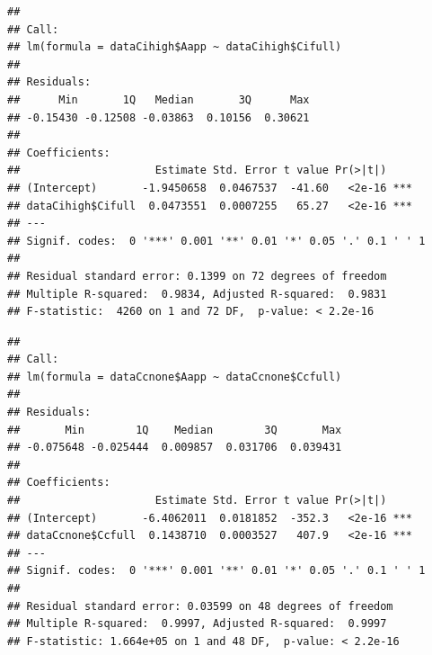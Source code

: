 \documentclass[
]{krantz}
\makeatletter
\newenvironment{Shaded}{\begin{snugshade}}{\end{snugshade}}
\newcommand{\CommentTok}[1]{\textcolor[rgb]{0.56,0.35,0.01}{\textit{#1}}}
\newcommand{\DecValTok}[1]{\textcolor[rgb]{0.00,0.00,0.81}{#1}}
\newcommand{\KeywordTok}[1]{\textcolor[rgb]{0.13,0.29,0.53}{\textbf{#1}}}
\newcommand{\NormalTok}[1]{#1}
\newcommand{\OperatorTok}[1]{\textcolor[rgb]{0.81,0.36,0.00}{\textbf{#1}}}
\newcommand{\StringTok}[1]{\textcolor[rgb]{0.31,0.60,0.02}{#1}}
\newenvironment{kframe}{%
\medskip{}
\setlength{\fboxsep}{.8em}
 \def\at@end@of@kframe{}%
 \ifinner\ifhmode%
  \def\at@end@of@kframe{\end{minipage}}%
  \begin{minipage}{\columnwidth}%
 \fi\fi%
 \def\FrameCommand##1{\hskip\@totalleftmargin \hskip-\fboxsep
 \colorbox{shadecolor}{##1}\hskip-\fboxsep
     \hskip-\linewidth \hskip-\@totalleftmargin \hskip\columnwidth}%
 \MakeFramed {\advance\hsize-\width
   \@totalleftmargin\z@ \linewidth\hsize
   \@setminipage}}%
 {\par\unskip\endMakeFramed%
 \at@end@of@kframe}
\renewenvironment{Shaded}{\begin{kframe}}{\end{kframe}}
\makeatother
\begin{document}
\begin{verbatim}
## 
## Call:
## lm(formula = dataCihigh$Aapp ~ dataCihigh$Cifull)
## 
## Residuals:
##      Min       1Q   Median       3Q      Max 
## -0.15430 -0.12508 -0.03863  0.10156  0.30621 
## 
## Coefficients:
##                     Estimate Std. Error t value Pr(>|t|)    
## (Intercept)       -1.9450658  0.0467537  -41.60   <2e-16 ***
## dataCihigh$Cifull  0.0473551  0.0007255   65.27   <2e-16 ***
## ---
## Signif. codes:  0 '***' 0.001 '**' 0.01 '*' 0.05 '.' 0.1 ' ' 1
## 
## Residual standard error: 0.1399 on 72 degrees of freedom
## Multiple R-squared:  0.9834, Adjusted R-squared:  0.9831 
## F-statistic:  4260 on 1 and 72 DF,  p-value: < 2.2e-16
\end{verbatim}

\begin{Shaded}
\end{Shaded}

\begin{verbatim}
## 
## Call:
## lm(formula = dataCcnone$Aapp ~ dataCcnone$Ccfull)
## 
## Residuals:
##       Min        1Q    Median        3Q       Max 
## -0.075648 -0.025444  0.009857  0.031706  0.039431 
## 
## Coefficients:
##                     Estimate Std. Error t value Pr(>|t|)    
## (Intercept)       -6.4062011  0.0181852  -352.3   <2e-16 ***
## dataCcnone$Ccfull  0.1438710  0.0003527   407.9   <2e-16 ***
## ---
## Signif. codes:  0 '***' 0.001 '**' 0.01 '*' 0.05 '.' 0.1 ' ' 1
## 
## Residual standard error: 0.03599 on 48 degrees of freedom
## Multiple R-squared:  0.9997, Adjusted R-squared:  0.9997 
## F-statistic: 1.664e+05 on 1 and 48 DF,  p-value: < 2.2e-16
\end{verbatim}
\end{document}

